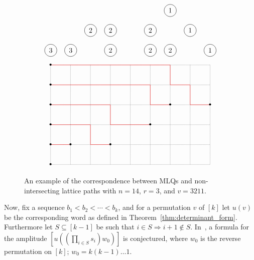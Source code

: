 \documentclass[reqno]{amsart}
\newcommand{\0}{\phantom{c}}
\let\prodnonlimits\prod
\renewcommand{\prod}{\prodnonlimits\limits}
\theoremstyle{plain}
\theoremstyle{definition}
\numberwithin{equation}{section}
\begin{document}
\begin{figure}
\[
\begin{tikzpicture}
  \node[circle,draw=black] at  (1, 0){3};
  \node[circle,draw=black] at  (2, 0){3};
  \node[circle,draw=black] at  (4, 0){2};
  \node[circle,draw=black] at  (6, 0){2};
  \node[circle,draw=black] at  (7, 0){2};
  \node[circle,draw=black] at  (9, 0){1};
  \node[circle,draw=black] at  (3, 1){2};
  \node[circle,draw=black] at  (4, 1){2};
  \node[circle,draw=black] at  (6, 1){2};
  \node[circle,draw=black] at  (8, 1){1};
  \node[circle,draw=black] at  (7, 2){1};
\end{tikzpicture}
\]
\[
\begin{tikzpicture}
  \draw[densely dotted] (1, 1) -- (9, 1);
  \draw[densely dotted] (1, 2) -- (9, 2);
  \draw[densely dotted] (1, 3) -- (9, 3);
  \draw[densely dotted] (1, 4) -- (9, 4);
  \draw[densely dotted] (1, 5) -- (9, 5);
  \draw[densely dotted] (1, 6) -- (9, 6);

  \draw[densely dotted] (1, 6) -- (1, 1);
  \draw[densely dotted] (2, 6) -- (2, 1);
  \draw[densely dotted] (3, 6) -- (3, 1);
  \draw[densely dotted] (4, 6) -- (4, 1);
  \draw[densely dotted] (5, 6) -- (5, 1);
  \draw[densely dotted] (6, 6) -- (6, 1);
  \draw[densely dotted] (7, 6) -- (7, 1);
  \draw[densely dotted] (8, 6) -- (8, 1);
  \draw[densely dotted] (9, 6) -- (9, 1);

  \draw[draw=red] (1,2)--(2,2);
  \draw[draw=red] (1,3)--(3,3)--(3,2)--(4,2);
  \draw[draw=red] (1,4)--(4,4)--(4,3)--(6,3);
  \draw[draw=red] (1,5)--(6,5)--(6,4)--(7,4);
  \draw[draw=red] (1,6)--(7,6)--(7,5)--(8,5)--(8,4)--(9,4);

  \node at (1,1){\textbullet};
  \node at (1,2){\textbullet};
  \node at (1,3){\textbullet};
  \node at (1,4){\textbullet};
  \node at (1,5){\textbullet};
  \node at (1,6){\textbullet};
  \node at (2,2){\textbullet};
  \node at (4,2){\textbullet};
  \node at (6,3){\textbullet};
  \node at (7,4){\textbullet};
  \node at (9,4){\textbullet};
\end{tikzpicture}
\]
\caption{An example of the correspondence between MLQs and non-intersecting lattice paths with $n = 14$, $r = 3$, and $v = 3211$.}
\label{fig:MLQ_NLP}
\end{figure}

Now, fix a sequence $b_1 < b_2 < \cdots < b_k$, and for a permutation $v$ of $[k]$ let $u(v)$ be the corresponding word as defined in Theorem~\ref{thm:determinant_form}.
Furthermore let $S \subseteq [k-1]$ be such that $i\in S \Rightarrow i+1 \notin S$.
In~\cite{AasLin17}, a formula for the amplitude $\left[ u((\prod_{i\in S} s_i)w_0) \right]$ is conjectured, where $w_0$ is the reverse permutation on $[k]$; $w_0 = k(k-1)\dots 1$.
\end{document}
